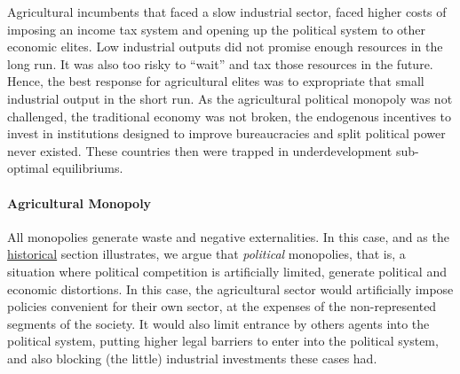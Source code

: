 \documentclass[onesided]{article}\usepackage[]{graphicx}\usepackage[]{color}
\begin{document}
Agricultural incumbents that faced a slow industrial sector, faced higher costs of imposing an income tax system and opening up the political system to other economic elites. Low industrial outputs did not promise enough resources in the long run. It was also too risky to ``wait'' and tax those resources in the future. Hence, the best response for agricultural elites was to expropriate that small industrial output in the short run. As the agricultural political monopoly was not challenged, the traditional economy was not broken, the endogenous incentives to invest in institutions designed to improve bureaucracies and split political power never existed. These countries then were trapped in underdevelopment sub-optimal equilibriums.


\paragraph{Agricultural Monopoly} All monopolies generate waste and negative externalities. In this case, and as the \hyperref[unpacking]{historical} section illustrates, we argue that \emph{political} monopolies, that is, a situation where political competition is artificially limited, generate  political and economic distortions. In this case, the agricultural sector would artificially impose policies convenient for their own sector, at the expenses of the non-represented segments of the society. It would also limit entrance by others agents into the political system, putting higher legal barriers to enter into the political system, and also blocking (the little) industrial investments these cases had.


\end{document}
